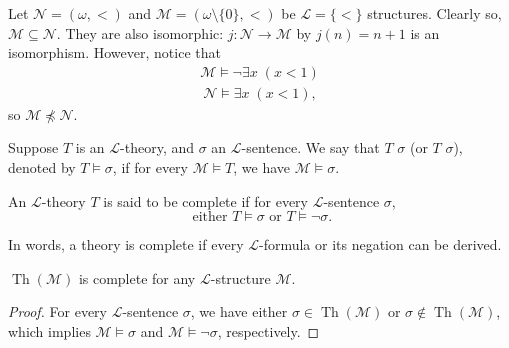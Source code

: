 \documentclass[notoc,notitlepage]{tufte-book}
\DeclareMathOperator{\Th}{Th }
\begin{document}
\begin{eg}[$\subseteq + \equiv \neq \preceq$]
  Let $\mathcal{N} = (\omega, <)$ and $\mathcal{M} = (\omega \setminus \{ 0 \}, <)$ be $\mathcal{L} = \{ < \}$ structures. Clearly so, $\mathcal{M} \subseteq \mathcal{N}$. They are also isomorphic: $j : \mathcal{N} \to \mathcal{M}$ by $j(n) = n + 1$ is an isomorphism. However, notice that
  \begin{gather*}
    \mathcal{M} \models \neg \exists x \; ( x < 1 ) \\\
    \mathcal{N} \models \exists x \; (x < 1),
  \end{gather*}
  so $\mathcal{M} \not\preceq \mathcal{N}$.
\end{eg}

\begin{defn}[Implication]\label{defn:implication}
  Suppose $T$ is an $\mathcal{L}$-theory, and $\sigma$ an $\mathcal{L}$-sentence. We say that $T$  $\sigma$ (or $T$  $\sigma$), denoted by $T \models \sigma$, if for every $\mathcal{M} \models T$, we have $\mathcal{M} \models \sigma$.
\end{defn}

\begin{defn}[Complete]\label{defn:complete}
  An $\mathcal{L}$-theory $T$ is said to be complete if for every $\mathcal{L}$-sentence $\sigma$,
  \begin{equation*}
    \text{ either } T \models \sigma \text{ or } T \models \neg \sigma.
  \end{equation*}
\end{defn}

\begin{note}
  In words, a theory is complete if every $\mathcal{L}$-formula or its negation can be derived.
\end{note}

\begin{eg}
  $\Th(\mathcal{M})$ is complete for any $\mathcal{L}$-structure $\mathcal{M}$.
\end{eg}

\begin{proof}
  For every $\mathcal{L}$-sentence $\sigma$, we have either $\sigma \in \Th(\mathcal{M})$ or $\sigma \notin \Th(\mathcal{M})$, which implies $\mathcal{M} \models \sigma$ and $\mathcal{M} \models \neg \sigma$, respectively.
\end{proof}
\end{document}
